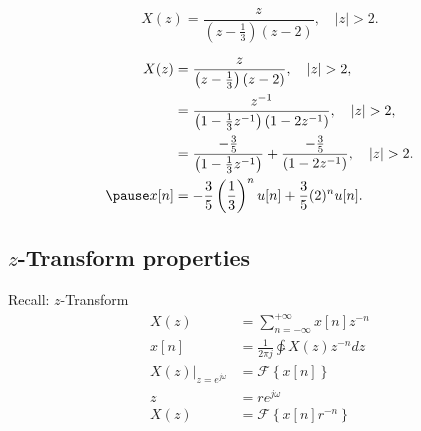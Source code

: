 \begin{frame}
    \begin{example}
        \begin{equation*}
            X(z) = \frac{z}{\left(z-\frac{1}{3}\right)(z-2)}, \quad |z|>2.
        \end{equation*}
    \end{example}
    \pause
    {
            \begin{align*}
                X(z) &= \frac{z}{\left(z-\frac{1}{3}\right)(z-2)}, \quad |z|>2,\\
                &= \frac{z^{-1}}{\left(1-\frac{1}{3}z^{-1}\right)(1-2z^{-1})}, \quad |z|>2,\\
                &= \frac{-\frac{3}{5}}{\left(1-\frac{1}{3}z^{-1}\right)} + \frac{-\frac{3}{5}}{(1-2z^{-1})}, \quad |z|>2.\\
                \pause
                x[n] &=  -\frac{3}{5} \left(\frac{1}{3}\right)^nu[n] + \frac{3}{5} (2)^n u[n].\\
            \end{align*}

    }
\end{frame}




\subsection{$z$-Transform properties}
\begin{frame}{Recall: $z$-Transform}
    \begin{align*}
        X(z) &= \sum_{n=-\infty}^{+\infty}x[n]z^{-n}\\
        x[n] &= \frac{1}{2\pi j}\ointctrclockwise X(z)z^{-n}dz\\
        \left.X(z)\right|_{z=e^{j\omega}} &= \mathcal{F}\left\{x[n]\right\}\\
        z &= re^{j\omega}\\
        X(z) &= \mathcal{F}\left\{x[n]r^{-n}\right\}
    \end{align*}
\end{frame}




